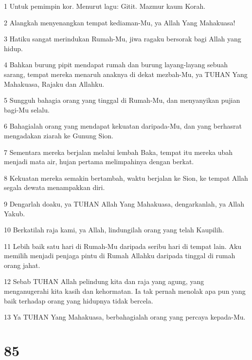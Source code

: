 \par 1 Untuk pemimpin kor. Menurut lagu: Gitit. Mazmur kaum Korah.
\par 2 Alangkah menyenangkan tempat kediaman-Mu, ya Allah Yang Mahakuasa!
\par 3 Hatiku sangat merindukan Rumah-Mu, jiwa ragaku bersorak bagi Allah yang hidup.
\par 4 Bahkan burung pipit mendapat rumah dan burung layang-layang sebuah sarang, tempat mereka menaruh anaknya di dekat mezbah-Mu, ya TUHAN Yang Mahakuasa, Rajaku dan Allahku.
\par 5 Sungguh bahagia orang yang tinggal di Rumah-Mu, dan menyanyikan pujian bagi-Mu selalu.
\par 6 Bahagialah orang yang mendapat kekuatan daripada-Mu, dan yang berhasrat mengadakan ziarah ke Gunung Sion.
\par 7 Sementara mereka berjalan melalui lembah Baka, tempat itu mereka ubah menjadi mata air, hujan pertama melimpahinya dengan berkat.
\par 8 Kekuatan mereka semakin bertambah, waktu berjalan ke Sion, ke tempat Allah segala dewata menampakkan diri.
\par 9 Dengarlah doaku, ya TUHAN Allah Yang Mahakuasa, dengarkanlah, ya Allah Yakub.
\par 10 Berkatilah raja kami, ya Allah, lindungilah orang yang telah Kaupilih.
\par 11 Lebih baik satu hari di Rumah-Mu daripada seribu hari di tempat lain. Aku memilih menjadi penjaga pintu di Rumah Allahku daripada tinggal di rumah orang jahat.
\par 12 Sebab TUHAN Allah pelindung kita dan raja yang agung, yang menganugerahi kita kasih dan kehormatan. Ia tak pernah menolak apa pun yang baik terhadap orang yang hidupnya tidak bercela.
\par 13 Ya TUHAN Yang Mahakuasa, berbahagialah orang yang percaya kepada-Mu.

\chapter{85}

